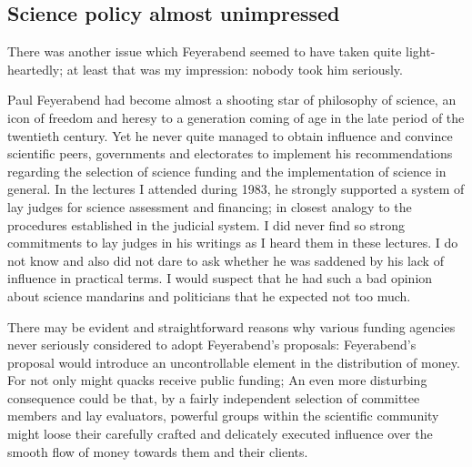 \documentclass{article}
\begin{document}
\subsection{Science policy almost unimpressed}
There was another issue which Feyerabend seemed to have taken quite light-heartedly;
at least that was my impression:
nobody took him seriously.

Paul Feyerabend had become almost a shooting star of philosophy of science,
an icon of freedom and heresy
to a generation coming of age in the late period of the twentieth century.
Yet he never quite managed to obtain influence
and convince scientific peers, governments and electorates to implement
his recommendations regarding the selection of science funding and the implementation
of science in general.
In the lectures I attended during 1983,
he strongly supported a system of  lay judges for science assessment  and  financing;
in closest analogy to the procedures established in the judicial system.
I did never find so strong commitments to  lay judges in his writings
as I heard them in these lectures.
I do not know and also did not dare to ask whether he was saddened by his lack of influence
in practical terms.
I would suspect that he had such a bad opinion about science mandarins
and politicians that he expected not too much.

There may be evident and straightforward reasons why various funding agencies never seriously
considered to adopt Feyerabend's proposals:
Feyerabend's proposal would introduce an uncontrollable element in the distribution of money.
For not only might quacks receive public funding;
An even more disturbing consequence could be that, by a fairly independent
selection of committee members and lay evaluators,
powerful groups within the scientific community might loose their carefully
crafted and delicately executed influence over the smooth flow of money towards them and their clients.
\end{document}
